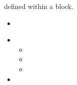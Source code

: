 defined within a  block.
%
\attrIntro
\begin{itemize}
\itemsep0em
\item \nameDescription
\end{itemize}
\begin{itemize}
  \item \variableDescription
    \variableChildrenIntro
    \begin{itemize}
      \item \distributionDescription
      \item \functionDescription
      \item \gridDescription
    \end{itemize}
  \item \constantVariablesDescription
\end{itemize}

